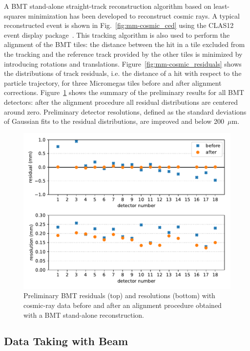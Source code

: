 A BMT stand-alone straight-track reconstruction algorithm based on least-squares minimization has been developed to
reconstruct cosmic rays. A typical reconstructed event is shown in Fig.~\ref{fig:mm-cosmic_ced} using the CLAS12 event
display package~\cite{recon-nim}. This tracking algorithm is also used to perform the alignment of the BMT tiles: the
distance between the hit in a tile excluded from the tracking and the reference track provided by the other tiles is
minimized by introducing rotations and translations. Figure~\ref{fig:mm-cosmic_residuals} shows the distributions of
track residuals, i.e. the distance of a hit with respect to the particle trajectory, for three Micromegas tiles before and
after alignment corrections. Figure~\ref{fig:mm-cosmic_res_summary} shows the summary of the preliminary results for
all BMT detectors: after the alignment procedure all residual distributions are centered around zero. Preliminary detector
resolutions, defined as the standard deviations of Gaussian fits to the residual distributions, are improved and below
200~$\mu$m. 

\begin{figure}[htb]
 \includegraphics[width=\columnwidth]{images/residuals_and_resolutions.pdf}
 \caption{Preliminary BMT residuals (top) and resolutions (bottom) with cosmic-ray data before and after an alignment
   procedure obtained with a BMT stand-alone reconstruction.}
 \label{fig:mm-cosmic_res_summary}
\end{figure}

\subsection{Data Taking with Beam}

